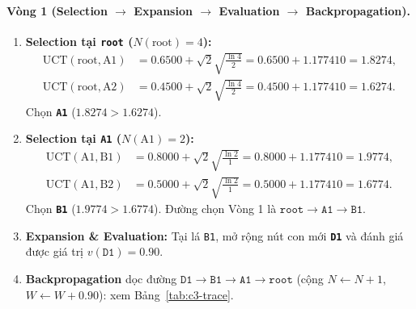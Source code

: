 \paragraph{Vòng 1 (Selection $\to$ Expansion $\to$ Evaluation $\to$ Backpropagation).}
\begin{enumerate}
  \item \textbf{Selection tại \texttt{root} ($N(\text{root}) = 4$):}
  \begin{align*}
    \text{UCT}(\text{root}, \text{A1}) &= 0.6500 + \sqrt{2}\sqrt{\frac{\ln 4}{2}} = 0.6500 + 1.177410 = 1.8274, \\
    \text{UCT}(\text{root}, \text{A2}) &= 0.4500 + \sqrt{2}\sqrt{\frac{\ln 4}{2}} = 0.4500 + 1.177410 = 1.6274.
  \end{align*}
  Chọn \textbf{\texttt{A1}} ($1.8274 > 1.6274$).
  \item \textbf{Selection tại \texttt{A1} ($N(\text{A1}) = 2$):}
  \begin{align*}
    \text{UCT}(\text{A1}, \text{B1}) &= 0.8000 + \sqrt{2}\sqrt{\frac{\ln 2}{1}} = 0.8000 + 1.177410 = 1.9774, \\
    \text{UCT}(\text{A1}, \text{B2}) &= 0.5000 + \sqrt{2}\sqrt{\frac{\ln 2}{1}} = 0.5000 + 1.177410 = 1.6774.
  \end{align*}
  Chọn \textbf{\texttt{B1}} ($1.9774 > 1.6774$). Đường chọn Vòng 1 là $\texttt{root} \to \texttt{A1} \to \texttt{B1}$.
  \item \textbf{Expansion \& Evaluation:} Tại lá \texttt{B1}, mở rộng nút con mới \textbf{\texttt{D1}} và đánh giá được giá trị $v(\texttt{D1}) = 0.90$.
  \item \textbf{Backpropagation} dọc đường $\texttt{D1} \to \texttt{B1} \to \texttt{A1} \to \texttt{root}$ (cộng $N \leftarrow N+1$, $W \leftarrow W+0.90$): xem Bảng~\ref{tab:c3-trace}.
\end{enumerate}

